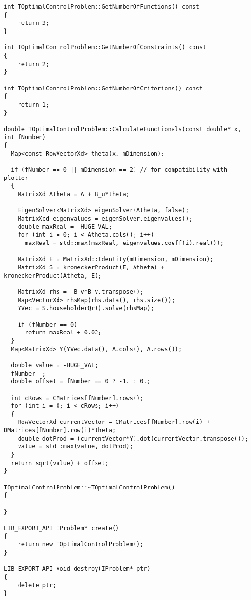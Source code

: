 \begin{lstlisting}[frame=single]
int TOptimalControlProblem::GetNumberOfFunctions() const
{
	return 3;
}

int TOptimalControlProblem::GetNumberOfConstraints() const
{
	return 2;
}

int TOptimalControlProblem::GetNumberOfCriterions() const
{
	return 1;
}

double TOptimalControlProblem::CalculateFunctionals(const double* x, int fNumber)
{
  Map<const RowVectorXd> theta(x, mDimension);

  if (fNumber == 0 || mDimension == 2) // for compatibility with plotter
  {
    MatrixXd Atheta = A + B_u*theta;

    EigenSolver<MatrixXd> eigenSolver(Atheta, false);
    MatrixXcd eigenvalues = eigenSolver.eigenvalues();
    double maxReal = -HUGE_VAL;
    for (int i = 0; i < Atheta.cols(); i++)
      maxReal = std::max(maxReal, eigenvalues.coeff(i).real());

    MatrixXd E = MatrixXd::Identity(mDimension, mDimension);
    MatrixXd S = kroneckerProduct(E, Atheta) + kroneckerProduct(Atheta, E);

    MatrixXd rhs = -B_v*B_v.transpose();
    Map<VectorXd> rhsMap(rhs.data(), rhs.size());
    YVec = S.householderQr().solve(rhsMap);

    if (fNumber == 0)
      return maxReal + 0.02;
  }
  Map<MatrixXd> Y(YVec.data(), A.cols(), A.rows());

  double value = -HUGE_VAL;
  fNumber--;
  double offset = fNumber == 0 ? -1. : 0.;

  int cRows = CMatrices[fNumber].rows();
  for (int i = 0; i < cRows; i++)
  {
    RowVectorXd currentVector = CMatrices[fNumber].row(i) + DMatrices[fNumber].row(i)*theta;
    double dotProd = (currentVector*Y).dot(currentVector.transpose());
    value = std::max(value, dotProd);
  }
  return sqrt(value) + offset;
}

TOptimalControlProblem::~TOptimalControlProblem()
{

}

LIB_EXPORT_API IProblem* create()
{
	return new TOptimalControlProblem();
}

LIB_EXPORT_API void destroy(IProblem* ptr)
{
	delete ptr;
}
\end{lstlisting}
